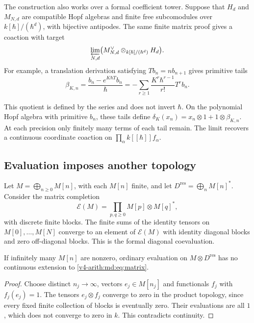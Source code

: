 The construction also works over a formal coefficient tower.
Suppose that $H_d$ and $M_{N,d}$ are compatible Hopf algebras
and finite free subcomodules over $k[\hbar]/(\hbar^d)$,
with bijective antipodes. The same finite matrix proof gives
a coaction with target
\[
 \varprojlim_{N,d}
 \bigl(M_{N,d}^{\vee}\otimes_{k[\hbar]/(\hbar^d)}H_d\bigr).
\]
For example, a translation derivation satisfying
$Tb_n=nb_{n+1}$ gives primitive tails
\[
 \beta_{K,n}=\frac{b_n-e^{K\hbar T}b_n}{\hbar}
 =-\sum_{r\geq1}\frac{K^r\hbar^{r-1}}{r!}T^rb_n.
\]

This quotient is defined by the series and does not invert
$\hbar$. On the polynomial Hopf algebra with primitive
$b_n$, these tails define
$\delta_K(x_n)=x_n\otimes1+1\otimes\beta_{K,n}$.
At each precision only finitely many terms of each tail
remain. The limit recovers a continuous coordinate coaction
on $\prod_\alpha k[[\hbar]]f_\alpha$.

\subsection{Evaluation imposes another topology}

Let $M=\bigoplus_{n\geq0}M[n]$, with each $M[n]$ finite,
and let $D^{\mathrm{res}}=\bigoplus_nM[n]^*$.
Consider the matrix completion
\begin{equation}\label{v4-arith:md:eq:matrix}
 \mathscr E(M)=\prod_{p,q\geq0}M[p]\otimes M[q]^*,
\end{equation}
with discrete finite blocks. The finite sums of the identity
tensors on $M[0],\ldots,M[N]$ converge to an element of
$\mathscr E(M)$ with identity diagonal blocks and zero
off-diagonal blocks. This is the formal diagonal coevaluation.

\begin{proposition}
\label{v4-arith:md:prop:evaluation}
If infinitely many $M[n]$ are nonzero, ordinary evaluation
on $M\otimes D^{\mathrm{res}}$ has no continuous extension
to \eqref{v4-arith:md:eq:matrix}.
\end{proposition}

\begin{proof}
Choose distinct $n_j\to\infty$, vectors $e_j\in M[n_j]$
and functionals $f_j$ with $f_j(e_j)=1$.
The tensors $e_j\otimes f_j$ converge to zero in the
product topology, since every fixed finite collection of
blocks is eventually zero. Their evaluations are all $1$,
which does not converge to zero in $k$. This contradicts
continuity.
\end{proof}

